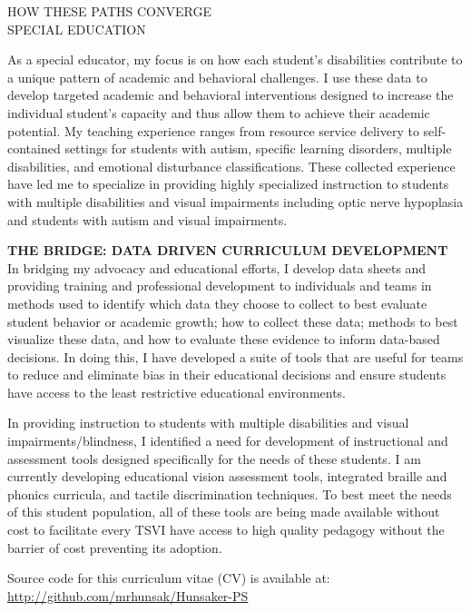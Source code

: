 \documentclass{resume} %
\begin{document}
\begin{rSection}{HOW THESE PATHS CONVERGE\\SPECIAL EDUCATION}

As a special educator, my focus is on how each student’s disabilities contribute to a unique pattern of academic and behavioral challenges. I use these data to develop targeted academic and behavioral interventions designed to increase the individual student's capacity and thus allow them to achieve their academic potential. My teaching experience ranges from resource service delivery to self-contained settings for students with autism, specific learning disorders, multiple disabilities, and emotional disturbance classifications. These collected experience have led me to specialize in providing highly specialized instruction to students with multiple disabilities and visual impairments including optic nerve hypoplasia and students with autism and visual impairments. 

{\bf THE BRIDGE: DATA DRIVEN CURRICULUM DEVELOPMENT}\\
In bridging my advocacy and educational efforts, I develop data sheets and providing training and professional development to individuals and teams in methods used to identify which data they choose to collect to best evaluate student behavior or academic growth; how to collect these data; methods to best visualize these data, and how to evaluate these evidence to inform data-based decisions. In doing this, I have developed a suite of tools that are useful for teams to reduce and eliminate bias in their educational decisions and ensure students have access to the least restrictive educational environments.

In providing instruction to students with multiple disabilities and visual impairments/blindness, I identified a need for development of instructional and assessment tools designed specifically for the needs of these students. I am currently developing educational vision assessment tools, integrated braille and phonics curricula, and tactile discrimination techniques. To best meet the needs of this student population, all of these tools are being made available without cost to facilitate every TSVI have access to high quality pedagogy without the barrier of cost preventing its adoption. 

\end{rSection}

\vfill
\begin{center}
	Source code for this curriculum vitae (CV) is available at: \href{http://github.com/mrhunsak/Hunsaker-CV}{http://github.com/mrhunsak/Hunsaker-PS}
\end{center}
\newpage
\end{document}
